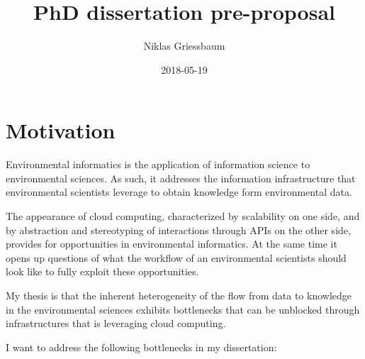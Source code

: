 \documentclass[a4paper,10pt]{article}
\title{PhD dissertation pre-proposal}
\author{Niklas Griessbaum}
\date{2018-05-19}
\begin{document}
\maketitle



\section{Motivation}

Environmental informatics is the application of information science to environmental sciences.
As such, it addresses the information infrastructure that environmental scientists leverage
to obtain knowledge form environmental data.

The appearance of cloud computing, characterized by scalability on one side, 
and by abstraction and stereotyping of interactions through APIs on the other side, 
provides for opportunities in environmental informatics. 
At the same time it opens up questions of what the workflow
of an environmental scientists should look like to fully exploit these opportunities.





My thesis is that the inherent heterogeneity of the flow from data to knowledge
in the environmental sciences exhibits bottlenecks that can be unblocked through infrastructures that is leveraging cloud computing.

I want to address the following bottlenecks in my dissertation:
\end{document}
